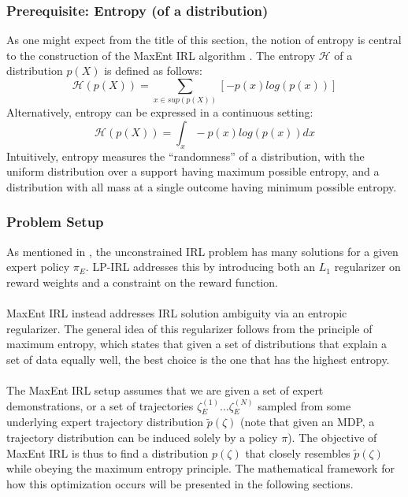 \documentclass[11pt]{article}
\begin{document}
\subsubsection{Prerequisite: Entropy (of a distribution)}
As one might expect from the title of this section, the notion of entropy is central to the construction of the MaxEnt IRL algorithm \cite{ziebart2008maximum}. The entropy $\mathcal{H}$ of a distribution $p(X)$ is defined as follows:
\begin{equation}
    \mathcal{H}(p(X)) = \sum_{x \in sup(p(X))} [- p(x) log(p(x))]
\end{equation}
Alternatively, entropy can be expressed in a continuous setting:
\begin{equation}
    \mathcal{H}(p(X)) = \int_x -p(x) log(p(x)) dx
\end{equation}
Intuitively, entropy measures the ``randomness'' of a distribution, with the uniform distribution over a support having maximum possible entropy, and a distribution with all mass at a single outcome having minimum possible entropy.

\subsubsection{Problem Setup}
As mentioned in \cite{ng2000algorithms}, the unconstrained IRL problem has many solutions for a given expert policy $\pi_E$. LP-IRL addresses this by introducing both an $L_1$ regularizer  on reward weights and a constraint on the reward function. \\\\
MaxEnt IRL instead addresses IRL solution ambiguity via an entropic regularizer. The general idea of this regularizer follows from the principle of maximum entropy, which states that given a set of distributions that explain a set of data equally well, the best choice is the one that has the highest entropy.\\\\
The MaxEnt IRL setup assumes that we are given a set of expert demonstrations, or a set of trajectories $\zeta^{(1)}_E \hdots \zeta^{(N)}_E$ sampled from some underlying expert trajectory distribution $\tilde{p}(\zeta)$ (note that given an MDP, a trajectory distribution can be induced solely by a policy $\pi$). The objective of MaxEnt IRL is thus to find a distribution $p(\zeta)$ that closely resembles $\tilde{p}(\zeta)$ while obeying the maximum entropy principle. The mathematical framework for how this optimization occurs will be presented in the following sections.
\end{document}

